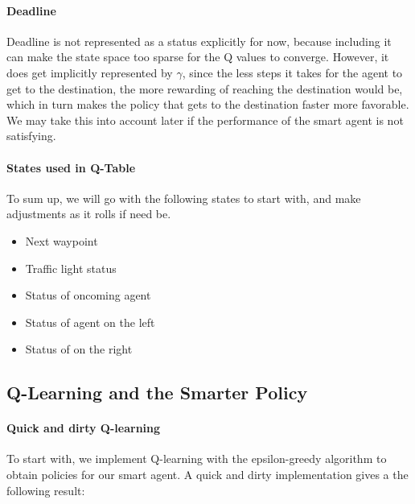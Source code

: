 \documentclass{article}
\providecommand{\tightlist}{%
      \setlength{\itemsep}{0pt}\setlength{\parskip}{0pt}}
\begin{document}
\paragraph{Deadline}\label{deadline}

Deadline is not represented as a status explicitly for now, because
including it can make the state space too sparse for the Q values to
converge. However, it does get implicitly represented by \(\gamma\),
since the less steps it takes for the agent to get to the destination,
the more rewarding of reaching the destination would be, which in turn
makes the policy that gets to the destination faster more favorable. We
may take this into account later if the performance of the smart agent
is not satisfying.

\paragraph{States used in Q-Table}\label{states-used-in-q-table}

To sum up, we will go with the following states to start with, and make
adjustments as it rolls if need be.

\begin{itemize}
\tightlist
\item
  Next waypoint
\item
  Traffic light status
\item
  Status of oncoming agent
\item
  Status of agent on the left
\item
  Status of on the right
\end{itemize}

\subsection{Q-Learning and the Smarter
Policy}\label{q-learning-and-the-smarter-policy}

\paragraph{Quick and dirty Q-learning}\label{quick-and-dirty-q-learning}

To start with, we implement Q-learning with the epsilon-greedy algorithm
to obtain policies for our smart agent. A quick and dirty implementation
gives a the following result:
\end{document}
